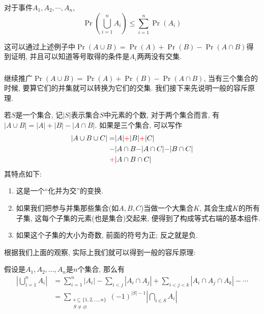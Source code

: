 \documentclass{ctexart}
\begin{document}
\subsubsection{}  

\begin{proposition}
    对于事件$A_1, A_2, \cdots, A_n$, 
    $$
\operatorname{Pr}\left(\bigcup_{i=1}^n A_i\right) \leq \sum_{i=1}^n \operatorname{Pr}\left(A_i\right)
$$
\end{proposition}

这可以通过上述例子中$\Pr(A\cup B)=\Pr(A)+\Pr(B)-\Pr(A\cap B)$得到证明, 并且可以知道等号取得的条件是$A_i$两两没有交集. 

\subsubsection{} 继续推广$\operatorname{Pr}(A \cup B)=\operatorname{Pr}(A)+\operatorname{Pr}(B)-\operatorname{Pr}(A \cap B)$, 当有三个集合的时候, 要算它们的并集就可以转换为它们的交集. 我们接下来先说明一般的容斥原理. 

若$S$是一个集合, 记$|S|$表示集合$S$中元素的个数, 对于两个集合而言, 有$|A \cup B|=|A|+|B|-|A \cap B|.$ 如果是三个集合, 可以写作
$$
\begin{aligned}
|A \cup B \cup C| =& |A|{{\color{red}+}}|B|{{\color{red}+}}|C| \\
{{\color{blue}-}}&|A \cap B{{\color{blue}-}}|A \cap C|{{\color{blue}-}}|B \cap C| \\
{{\color{red}+}}&|A \cap B \cap C| 
\end{aligned}
$$
其特点如下: 
\begin{enumerate}
    \item 这是一个``化并为交''的变换. 
    \item 如果我们把参与并集那些集合(如$A,B,C$)当做一个大集合$K$, 其会生成$K$的所有子集, 这每个子集的元素(也是集合)交起来, 便得到了构成等式右端的基本组件.
    \item 如果这个子集的大小为奇数, 前面的符号为正; 反之就是负. 

\end{enumerate}

根据我们上面的观察, 实际上我们就可以得到一般的容斥原理: 

\begin{theorem}[容斥原理]
    假设是$A_1, A_2, ... , A_n$是$n$个集合, 那么有
    $$
\begin{aligned}
\left|\bigcup_{i=1}^n A_i\right| & =\sum_{i=1}^n \left|A_i\right|-\sum_{i<j} \left|A_i \cap A_j\right|+\sum_{i<j<k} \left|A_i \cap A_j \cap A_k\right|-\cdots \\
& =\sum_{\substack{s \subseteq\{1,2, \ldots, n\} \\
S \neq \varnothing}}(-1)^{|S|-1} \left|\bigcap_{i \in S} A_i\right|
\end{aligned}
$$
\end{theorem}
\end{document}
